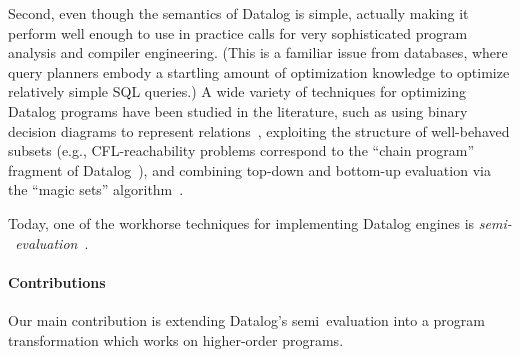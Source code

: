 Second, even though the semantics of Datalog is simple, actually
making it perform well enough to use in practice calls for very
sophisticated program analysis and compiler engineering. (This is a
familiar issue from databases, where query planners embody a startling
amount of optimization knowledge to optimize relatively simple SQL
queries.) A wide variety of techniques for optimizing Datalog programs
have been studied in the literature, such as using binary decision
diagrams to represent relations~\cite{whaley-phd}, exploiting the
structure of well-behaved subsets (e.g., CFL-reachability problems
correspond to the ``chain program'' fragment of
Datalog~\cite{chain-programs}), and combining top-down and bottom-up
evaluation via the ``magic sets'' algorithm~\cite{magic-sets}.

Today, one of the workhorse techniques for implementing Datalog
engines is \emph{semi-\naive\ evaluation}~\cite{semi-naive}.

\paragraph{Contributions} Our main contribution is
extending Datalog's semi\naive\ evaluation into a program transformation which
works on higher-order programs. \XXX






